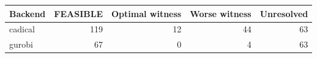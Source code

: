 \begin{tabular}{lrrrr}
\toprule
Backend & FEASIBLE & Optimal witness & Worse witness & Unresolved\\
\midrule
cadical & 119 & 12 & 44 & 63\\
gurobi & 67 & 0 & 4 & 63\\
\bottomrule
\end{tabular}
